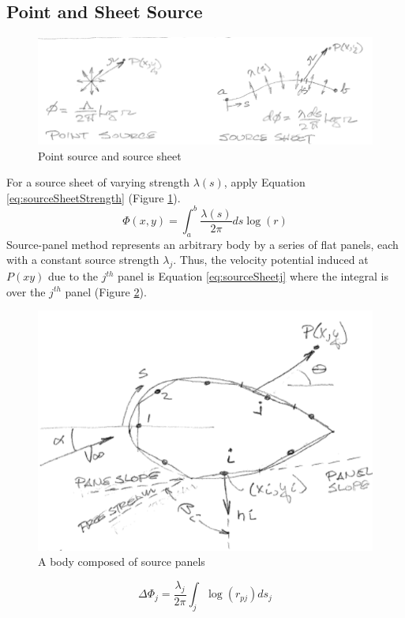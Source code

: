 \documentclass[draft=false, titlepage]{article}
\begin{document}
\subsection{Point and Sheet Source}
\begin{figure}[ht]
    \centering
    \includegraphics[width=0.9\linewidth]{Figures/pointAndSheetSource.PNG}
    \caption{Point source and source sheet}
    \label{fig:pointAndSheetSource}
\end{figure}
For a source sheet of varying strength $\lambda (s)$, apply Equation \ref{eq:sourceSheetStrength} (Figure \ref{fig:pointAndSheetSource}).
\begin{equation}
    \Phi(x,y) = \int_a^b \frac{\lambda(s)}{2\pi} ds \log(r)
    \label{eq:sourceSheetStrength}
\end{equation}
Source-panel method represents an arbitrary body by a series of flat panels, each with a constant source strength $\lambda_j$. Thus, the velocity potential induced at $P(x y)$ due to the $j^{th}$ panel is Equation \ref{eq:sourceSheetj} where the integral is over the $j^{th}$ panel (Figure \ref{fig:sourcePanelBody}).

\begin{figure}[ht]
    \centering
    \includegraphics[width=0.5\linewidth]{Figures/sourcePanelBody.PNG}
    \caption{A body composed of source panels}
    \label{fig:sourcePanelBody}
\end{figure}
\begin{equation}
    \Delta \Phi_j = \frac{\lambda_j}{2\pi} \int_j \log(r_{pj})ds_j
    \label{eq:sourceSheetj}
\end{equation}
\end{document}
